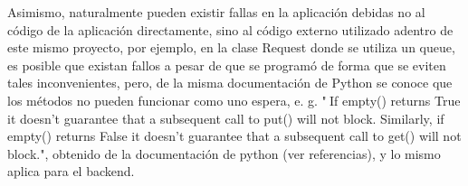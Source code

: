 Asimismo, naturalmente pueden existir fallas en la aplicación debidas no al código de la aplicación directamente, sino al código externo utilizado adentro de este mismo proyecto, por ejemplo, en la clase Request donde se utiliza un queue, es posible que existan fallos a pesar de que se programó de forma que se eviten tales inconvenientes, pero, de la misma documentación de Python se conoce que los métodos no pueden funcionar como uno espera, e. g. "$\:$If empty() returns True it doesn’t guarantee that a subsequent call to put() will not block. Similarly, if empty() returns False it doesn’t guarantee that a subsequent call to get() will not block.", obtenido de la documentación de python  (ver referencias), y lo mismo aplica para el backend.